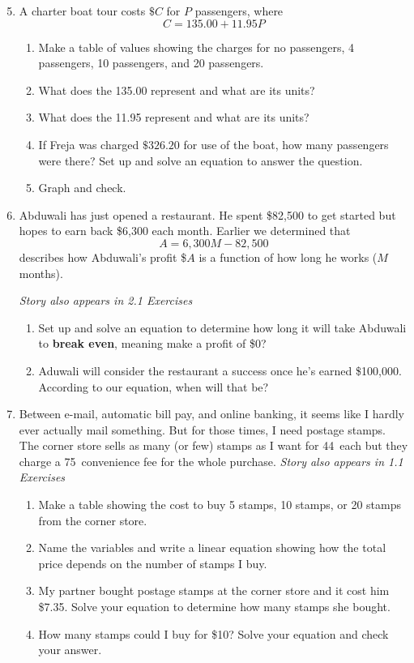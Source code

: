 \begin{enumerate} 	
\setcounter{enumi}{4}

\item A charter boat tour costs $\$C$ for $P$ passengers, where
$$C = 135.00 + 11.95P$$ %
\begin{enumerate}
\item Make a table of values showing the charges for no passengers, 4 passengers, 10 passengers, and 20 passengers. 
\item What does the 135.00 represent and what are its units?
\item What does the 11.95 represent and what are its units? 
\item If Freja was charged $\$ 326.20$ for use of the boat, how many passengers were there? Set up and solve an equation to answer the question.  
\item Graph and check.
\end{enumerate}

\item Abduwali has just opened a restaurant. He spent \$82,500 to get started but hopes to earn back \$6,300 each month.  Earlier we determined that $$A = 6,300M - 82,500$$ describes how Abduwali's profit \$$A$ is a function of how long he works ($M$ months). 

\hfill \emph{Story also appears in 2.1 Exercises}
\begin{enumerate}
\item Set up and solve an equation to determine how long it will take Abduwali to \textbf{break even}, meaning make a profit of \$0?
\item Aduwali will consider the restaurant a success once he's earned \$100,000.  According to our equation, when will that be?
\end{enumerate} 

\item Between e-mail, automatic bill pay, and online banking, it seems like I hardly ever actually mail something.   But for those times, I need postage stamps. The corner store sells as many (or few) stamps as I want for 44\textcent~each but they charge a 75\textcent~convenience fee for the whole purchase.  \hfill \emph{Story also appears in 1.1 Exercises}
\begin{enumerate}
\item Make a table showing the cost to buy 5 stamps, 10 stamps, or 20 stamps from the corner store.
\item Name the variables and write a linear equation showing how the total price depends on the number of stamps I buy.
\item My partner bought postage stamps at the corner store and it cost him \$7.35.  Solve your equation to determine how many stamps she bought. 
\item How many stamps could I buy for \$10?  Solve your equation and check your answer.
\end{enumerate} 


\end{enumerate}
